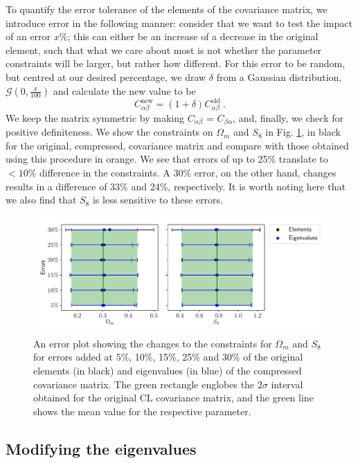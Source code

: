\documentclass[twocolumn]{\docclass}
\newcommand{\rf}[1]{\ref{fig:#1}}
\newcommand\be{\begin{equation}}
\newcommand\ee{\end{equation}}
\begin{document}
	To quantify the error tolerance of the elements of the covariance matrix, we introduce error in the following manner: consider that we want to test the impact of an error $x \%$; this can either be an increase of a decrease in the original element, such that what we care about most is not whether the parameter constraints will be larger, but rather how different. For this error to be random, but centred at our desired percentage, we draw $\delta$ from a Gaussian distribution, $\mathcal{G}(0,\frac{x}{100})$ and calculate the new value to be
	\be \label{eq:tolerance}
	C_{\alpha \beta}^{\mathrm{new}} = (1 + \delta)C_{\alpha \beta}^{\mathrm{old}}\ .
	\ee
	We keep the matrix symmetric by making $C_{\alpha \beta}$ = $C_{\beta \alpha}$, and, finally, we check for positive definiteness. We show the constraints on $\Omega_m$ and $S_8$ in Fig. \rf{tolerance}, in black for the original, compressed, covariance matrix and compare with those obtained using this procedure in orange. We see that errors of up to 25\% translate to $< 10\%$ difference in the constraints. A $30\%$ error, on the other hand, changes results in a difference of $33\%$ and $24\%$, respectively. It is worth noting here that we also find that $S_8$ is less sensitive to these errors.
	
	\begin{figure}
		\includegraphics[width=\columnwidth]{Tolerance_errors.pdf}
		\caption{An error plot showing the changes to the constraints for $\Omega_m$ and $S_8$ for errors added at $5\%$, 10\%, 15\%, 25\% and 30\% of the original elements (in black) and eigenvalues (in blue) of the compressed covariance matrix. The green rectangle englobes the $2 \sigma$ interval obtained for the original CL covariance matrix, and the green line shows the mean value for the respective parameter. } \label{fig:tolerance}
	\end{figure}
	
	\subsection{Modifying the eigenvalues}
	
\end{document}
